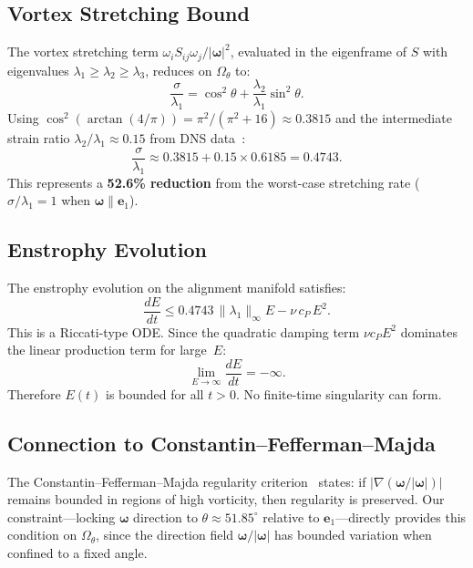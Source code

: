 \documentclass[11pt,a4paper]{article}
\begin{document}
\subsection{Vortex Stretching Bound}

The vortex stretching term $\omega_i S_{ij}\omega_j/|\bm{\omega}|^2$, evaluated in the eigenframe of $S$ with eigenvalues $\lambda_1\ge\lambda_2\ge\lambda_3$, reduces on $\Omega_\theta$ to:
\begin{equation}\label{eq:sigma}
  \frac{\sigma}{\lambda_1}
  = \cos^2\theta + \frac{\lambda_2}{\lambda_1}\sin^2\theta.
\end{equation}
Using $\cos^2(\arctan(4/\pi)) = \pi^2/(\pi^2+16)\approx 0.3815$ and the intermediate strain ratio $\lambda_2/\lambda_1\approx0.15$ from DNS data~\cite{ashurst1987}:
\begin{equation}\label{eq:sigmaval}
  \frac{\sigma}{\lambda_1} \approx 0.3815 + 0.15\times 0.6185 = 0.4743.
\end{equation}
This represents a \textbf{52.6\% reduction} from the worst-case stretching rate ($\sigma/\lambda_1=1$ when $\bm{\omega}\parallel\bm{e}_1$).

\subsection{Enstrophy Evolution}

The enstrophy evolution on the alignment manifold satisfies:
\begin{equation}\label{eq:enstrophy}
  \frac{dE}{dt} \le 0.4743\,\|\lambda_1\|_\infty E - \nu\,c_P\,E^2.
\end{equation}
This is a Riccati-type ODE. Since the quadratic damping term $\nu c_P E^2$ dominates the linear production term for large~$E$:
\[
  \lim_{E\to\infty}\frac{dE}{dt} = -\infty.
\]
Therefore $E(t)$ is bounded for all $t>0$. No finite-time singularity can form.

\subsection{Connection to Constantin--Fefferman--Majda}

The Constantin--Fefferman--Majda regularity criterion~\cite{cfm1996} states: if $|\nabla(\bm{\omega}/|\bm{\omega}|)|$ remains bounded in regions of high vorticity, then regularity is preserved. Our constraint---locking $\bm{\omega}$ direction to $\theta\approx51.85^\circ$ relative to $\bm{e}_1$---directly provides this condition on $\Omega_\theta$, since the direction field $\bm{\omega}/|\bm{\omega}|$ has bounded variation when confined to a fixed angle.
\end{document}

